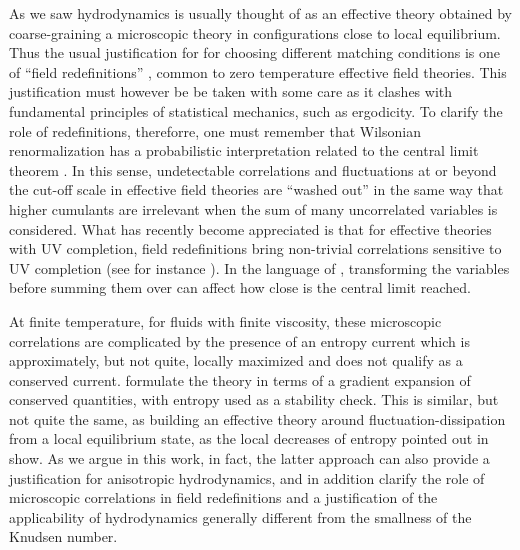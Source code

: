 \documentclass[12pt,onecolumn,showpacs,amssymb,aps,nofootinbib,floatfix]{revtex4-2}
\begin{document}
        \color{black}
        As we saw hydrodynamics is usually thought of as an effective theory obtained by coarse-graining a microscopic theory in configurations close to local equilibrium.  Thus
        the usual justification for for choosing different matching conditions \cite{bdnk} is one of ``field redefinitions'' \cite{kovtunani}, common to zero temperature effective field theories.    This justification must however be be taken with some care as it clashes with fundamental principles of statistical mechanics, such as ergodicity.    To clarify the role of redefinitions, thereforre, one must remember that Wilsonian renormalization has a probabilistic interpretation related to the central limit theorem \cite{jlreno}.   In this sense, undetectable correlations and fluctuations at or beyond the cut-off scale in effective field theories are ``washed out'' in the same way that higher cumulants are irrelevant when the sum of many uncorrelated variables is considered.    What has recently become appreciated is that for effective theories with UV completion, field redefinitions bring non-trivial correlations sensitive to UV completion (see for instance \cite{coveft}).   In the language of \cite{jlreno}, transforming the variables before summing them over can affect how close is the central limit reached.
        
        At finite temperature, for fluids with finite viscosity, these microscopic correlations are complicated by the presence of an entropy current which is approximately, but not quite, locally maximized and does not qualify as a conserved current.      \cite{bdnk,kovtunani} formulate the theory in terms of a gradient expansion of conserved quantities, with entropy used as a stability check.    This is similar, but not quite the same, as building an effective theory around fluctuation-dissipation from a local equilibrium state, as the local decreases of entropy pointed out in \cite{gavassino} show.    As we argue in this work, in fact, the latter approach can also provide a justification for anisotropic hydrodynamics, and in addition clarify the role of microscopic correlations in field redefinitions and a justification of the applicability of hydrodynamics generally different from the smallness of the Knudsen number.
        \color{black}
        
\end{document}
